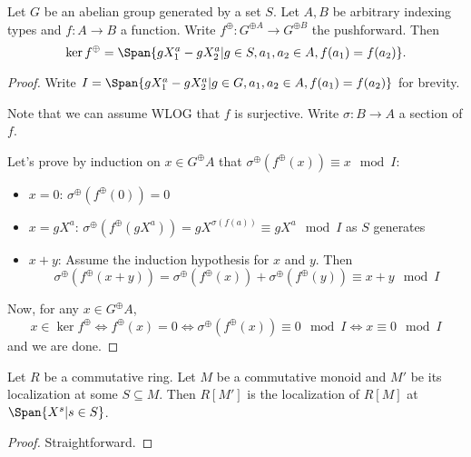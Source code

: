 \begin{proposition}
  \label{0-ker-mon-alg}
  \uses{}

  Let $G$ be an abelian group generated by a set $S$.
  Let $A, B$ be arbitrary indexing types and $f : A \to B$ a function.
  Write $f^\oplus : G^{\oplus A} \to G^{\oplus B}$ the pushforward.
  Then
  \[
    \ker f^\oplus = \Span\{gX^a_1 - gX^a_2 | g \in S, a_1, a_2 \in A, f(a_1) = f(a_2)\}.
  \]
\end{proposition}
\begin{proof}
  \uses{}

  Write $I = \Span\{gX^a_1 - gX^a_2 | g \in G, a_1, a_2 \in A, f(a_1) = f(a_2)\}$ for brevity.

  Note that we can assume WLOG that $f$ is surjective.
  Write $\sigma : B \to A$ a section of $f$.

  Let's prove by induction on $x \in G^\oplus A$ that $\sigma^\oplus(f^\oplus(x)) \equiv x \mod I$:
  \begin{itemize}
    \item $x = 0$: $\sigma^\oplus(f^\oplus(0)) = 0$
    \item $x = gX^a$:
      $\sigma^\oplus(f^\oplus(gX^a)) = gX^{\sigma(f(a))} \equiv gX^a \mod I$ as $S$ generates
    \item $x + y$: Assume the induction hypothesis for $x$ and $y$. Then
      \[
        \sigma^\oplus(f^\oplus(x + y)) = \sigma^\oplus(f^\oplus(x)) + \sigma^\oplus(f^\oplus(y))
          \equiv x + y \mod I
      \]
  \end{itemize}

  Now, for any $x \in G^\oplus A$,
  \[
    x \in \ker f^\oplus \iff f^\oplus(x) = 0 \iff
      \sigma^\oplus(f^\oplus(x)) \equiv 0 \mod I \iff x \equiv 0 \mod I
  \]
  and we are done.
\end{proof}


\begin{proposition}
  \label{0-loc-mon-alg}
  \uses{}

  Let $R$ be a commutative ring.
  Let $M$ be a commutative monoid and $M'$ be its localization at some $S \subseteq M$.
  Then $R[M']$ is the localization of $R[M]$ at $\Span \{X^s | s \in S\}$.
\end{proposition}
\begin{proof}
  \uses{}

  Straightforward.
\end{proof}


